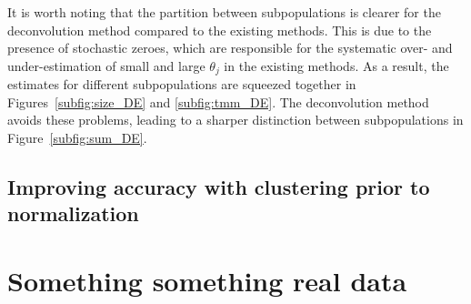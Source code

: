 \documentclass{article}
\begin{document}
It is worth noting that the partition between subpopulations is clearer for the deconvolution method compared to the existing methods.
This is due to the presence of stochastic zeroes, which are responsible for the systematic over- and under-estimation of small and large $\theta_j$ in the existing methods.
As a result, the estimates for different subpopulations are squeezed together in Figures~\ref{subfig:size_DE} and \ref{subfig:tmm_DE}.
The deconvolution method avoids these problems, leading to a sharper distinction between subpopulations in Figure~\ref{subfig:sum_DE}. 

\subsection{Improving accuracy with clustering prior to normalization}

\section{Something something real data}



\end{document}
